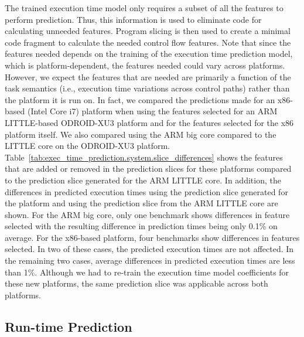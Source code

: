 The trained execution time model only requires a subset of all the features to
perform prediction. Thus, this information is used to eliminate code for
calculating unneeded features.  Program slicing is then used to create a
minimal code fragment to calculate the needed control flow features.  Note that
since the features needed depends on the training of the execution time
prediction model, which is platform-dependent, the features needed could vary
across platforms. However, we expect the features that are needed are
primarily a function of the task semantics (i.e., execution time variations
across control paths) rather than the platform it is run on. In fact, we
compared the predictions made for an x86-based (Intel Core i7) platform when
using the features selected for an ARM LITTLE-based ODROID-XU3 platform and for the
features selected for the x86 platform itself. We also compared using the ARM
big core compared to the LITTLE core on the ODROID-XU3 platform. 
Table~\ref{tab:exec_time_prediction.system.slice_differences} shows the
features that are added or removed in the prediction slices for these platforms
compared to the prediction slice generated for the ARM LITTLE core. In
addition, the differences in predicted execution times using the prediction
slice generated for the platform and using the prediction slice from the ARM
LITTLE core are shown. 
For the ARM big core, only one benchmark shows differences in feature selected
with the resulting difference in prediction times being only 0.1\% on average.
For the x86-based platform, four benchmarks show differences in features
selected. In two of these cases, the predicted execution times are not
affected. In the remaining two cases, average differences in predicted
execution times are less than 1\%.
Although we had to re-train the execution time model coefficients for these new
platforms, the same prediction slice was applicable across both platforms.

\subsection{Run-time Prediction}

